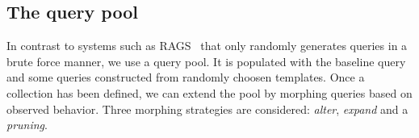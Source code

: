 \documentclass{cidr-2019}
\begin{document}
\subsection{The query pool}\label{morphing}
In contrast to systems such as RAGS~\cite{DBLP:conf/vldb/Slutz98} that
only randomly generates queries in a brute force manner, we use a
query pool. It is populated with the baseline query and some queries
constructed from randomly choosen templates. Once a collection has
been defined, we can extend the pool by morphing queries based on
observed behavior. Three morphing strategies are considered:
\emph{alter}, \emph{expand} and a \emph{pruning}.

\end{document}
